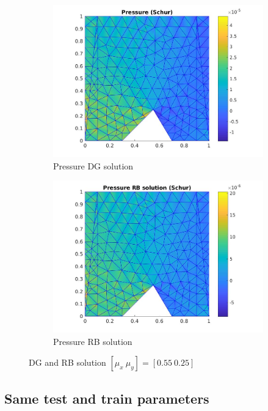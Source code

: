 \documentclass[a4paper,oneside,openright,spanish,english]{book}
\begin{document}
\begin{figure}[t!]
\medskip
\begin{subfigure}{0.48\textwidth}
\includegraphics[width=\linewidth]{offline_pressure_at_55_25.jpg}
\caption{Pressure DG solution} \label{pre_dg}
\end{subfigure}\hspace*{\fill}
\begin{subfigure}{0.48\textwidth}
\includegraphics[width=\linewidth]{online_pressure_at_55_25.jpg}
\caption{Pressure RB solution} \label{pre_rb}
\end{subfigure}
\caption{DG and RB solution $[\mu_x \ \mu_y] = [0.55 \ 0.25]$} 
\label{dg_rb_solution_55_25}
\end{figure}

\subsection{Same test and train parameters}
\end{document}
